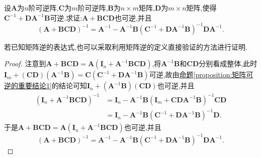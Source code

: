 \documentclass[../../main.tex]{subfiles}%
\begin{document}
\begin{proposition}\label{Sherman-Morrison-Woodbury公式}
设\(\boldsymbol{A}\)为\(n\)阶可逆阵,\(\boldsymbol{C}\)为\(m\)阶可逆阵,\(\boldsymbol{B}\)为\(n\times m\)矩阵,\(\boldsymbol{D}\)为\(m\times n\)矩阵,使得\(\boldsymbol{C}^{-1}+\boldsymbol{D}\boldsymbol{A}^{-1}\boldsymbol{B}\)可逆.求证:\(\boldsymbol{A}+\boldsymbol{B}\boldsymbol{C}\boldsymbol{D}\)也可逆,并且
\[
(\boldsymbol{A}+\boldsymbol{B}\boldsymbol{C}\boldsymbol{D})^{-1}=\boldsymbol{A}^{-1}-\boldsymbol{A}^{-1}\boldsymbol{B}(\boldsymbol{C}^{-1}+\boldsymbol{D}\boldsymbol{A}^{-1}\boldsymbol{B})^{-1}\boldsymbol{D}\boldsymbol{A}^{-1}.
\]
\end{proposition}
\begin{remark}
若已知矩阵逆的表达式,也可以采取利用矩阵逆的定义直接验证的方法进行证明.
\end{remark}
\begin{proof}

注意到\(\boldsymbol{A}+\boldsymbol{B}\boldsymbol{C}\boldsymbol{D}=\boldsymbol{A}(\boldsymbol{I}_{n}+\boldsymbol{A}^{-1}\boldsymbol{B}\boldsymbol{C}\boldsymbol{D})\),将\(\boldsymbol{A}^{-1}\boldsymbol{B}\)和\(\boldsymbol{C}\boldsymbol{D}\)分别看成整体,此时
\(\boldsymbol{I}_{m}+(\boldsymbol{C}\boldsymbol{D})(\boldsymbol{A}^{-1}\boldsymbol{B})=\boldsymbol{C}(\boldsymbol{C}^{-1}+\boldsymbol{D}\boldsymbol{A}^{-1}\boldsymbol{B})\)可逆,故由\hyperref[proposition:矩阵可逆的重要结论1]{命题\ref{proposition:矩阵可逆的重要结论1}}的结论可知\(\boldsymbol{I}_{n}+(\boldsymbol{A}^{-1}\boldsymbol{B})(\boldsymbol{C}\boldsymbol{D})\)也可逆,并且
\begin{align*}
(\boldsymbol{I}_{n}+\boldsymbol{A}^{-1}\boldsymbol{B}\boldsymbol{C}\boldsymbol{D})^{-1}&=\boldsymbol{I}_{n}-\boldsymbol{A}^{-1}\boldsymbol{B}(\boldsymbol{I}_{m}+\boldsymbol{C}\boldsymbol{D}\boldsymbol{A}^{-1}\boldsymbol{B})^{-1}\boldsymbol{C}\boldsymbol{D}\\
&=\boldsymbol{I}_{n}-\boldsymbol{A}^{-1}\boldsymbol{B}(\boldsymbol{C}^{-1}+\boldsymbol{D}\boldsymbol{A}^{-1}\boldsymbol{B})^{-1}\boldsymbol{D}.
\end{align*}
于是\(\boldsymbol{A}+\boldsymbol{B}\boldsymbol{C}\boldsymbol{D}=\boldsymbol{A}(\boldsymbol{I}_{n}+\boldsymbol{A}^{-1}\boldsymbol{B}\boldsymbol{C}\boldsymbol{D})\)也可逆,并且
\[
(\boldsymbol{A}+\boldsymbol{B}\boldsymbol{C}\boldsymbol{D})^{-1}=\boldsymbol{A}^{-1}-\boldsymbol{A}^{-1}\boldsymbol{B}(\boldsymbol{C}^{-1}+\boldsymbol{D}\boldsymbol{A}^{-1}\boldsymbol{B})^{-1}\boldsymbol{D}\boldsymbol{A}^{-1}.
\]

\end{proof}
\end{document}
